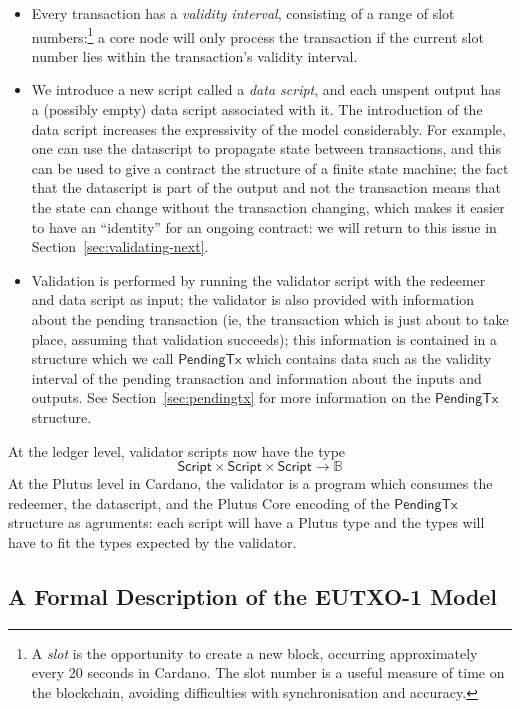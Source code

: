 \documentclass[a4paper]{article}
\newcounter{note}
\renewcommand{\i}{\textit}  %
\newcommand{\s}{\textsf}  %
\newcommand{\script}{\ensuremath{\s{Script}}}
\newcommand{\ptx}{\ensuremath{\s{PendingTx}}}
\newcommand\B{\ensuremath{\mathbb{B}}}
\begin{document}
\begin{itemize}
\item Every transaction has a \textit{validity interval}, consisting
  of a range of slot numbers:\footnote{A \textit{slot} is the
    opportunity to create a new block, occurring approximately every
    20 seconds in Cardano.  The slot number is a useful measure of
    time on the blockchain, avoiding difficulties with synchronisation
    and accuracy.} a core node will only process the transaction if
  the current slot number lies within the transaction's validity
  interval.

\item We introduce a new script called a \i{data script}, and each
  unspent output has a (possibly empty) data script associated with
  it.  The introduction of the data script increases the expressivity
  of the model considerably. For example, one can use the datascript
  to propagate state between transactions, and this can be used to
  give a contract the structure of a finite state machine; the fact
  that the datascript is part of the output and not the transaction
  means that the state can change without the transaction changing,
  which makes it easier to have an ``identity'' for an ongoing
  contract: we will return to this issue in
  Section~\ref{sec:validating-next}.
  
\item Validation is performed by running the validator script with the
  redeemer and data script as input; the validator is also provided
  with information about the pending transaction (ie, the transaction
  which is just about to take place, assuming that validation
  succeeds); this information is contained in a structure which we call
  \ptx{} which contains data such as the validity interval of the
  pending transaction and information about the inputs and outputs.
  See Section~\ref{sec:pendingtx} for more information on the $\ptx$
  structure.
  
\end{itemize}


\noindent At the ledger level, validator scripts now have the type
$$
\script \times \script \times \script \rightarrow \B
$$
At the Plutus level in Cardano, the validator is a program which
consumes the redeemer, the datascript, and the Plutus Core encoding of
the $\ptx$ structure as agruments: each script will have a Plutus type
and the types will have to fit the types expected by the validator.

\subsection{A Formal Description of the EUTXO-1 Model}
\label{section:eutxo-spec}
\end{document}

